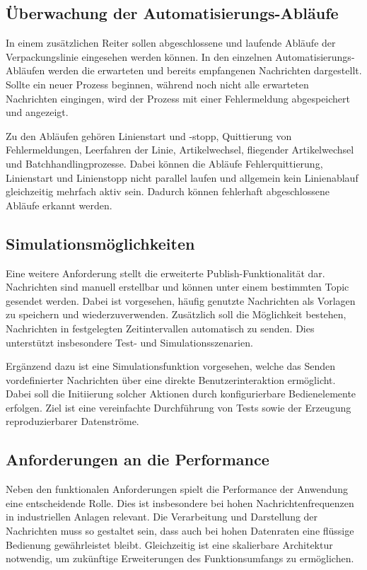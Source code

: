 \subsection{Überwachung der Automatisierungs-Abläufe}
In einem zusätzlichen Reiter sollen abgeschlossene und laufende Abläufe der Verpackungslinie eingesehen werden können. In den einzelnen Automatisierungs-Abläufen werden die erwarteten und bereits empfangenen Nachrichten dargestellt. Sollte ein neuer Prozess beginnen, während noch nicht alle erwarteten Nachrichten eingingen, wird der Prozess mit einer Fehlermeldung abgespeichert und angezeigt.

Zu den Abläufen gehören Linienstart und -stopp, Quittierung von Fehlermeldungen, Leerfahren der Linie, Artikelwechsel,  fliegender Artikelwechsel und Batchhandlingprozesse. Dabei können die Abläufe Fehlerquittierung, Linienstart und Linienstopp nicht parallel  laufen und allgemein kein Linienablauf gleichzeitig mehrfach aktiv sein. Dadurch können fehlerhaft abgeschlossene Abläufe erkannt werden.

\subsection{Simulationsmöglichkeiten}
Eine weitere Anforderung stellt die erweiterte Publish-Funktionalität dar. 
Nachrichten sind manuell erstellbar und können unter einem bestimmten Topic 
gesendet werden. Dabei ist vorgesehen, häufig genutzte Nachrichten 
als Vorlagen zu speichern und wiederzuverwenden. Zusätzlich soll die 
Möglichkeit bestehen, Nachrichten in festgelegten Zeitintervallen automatisch 
zu senden. Dies unterstützt insbesondere Test- und Simulationsszenarien.

Ergänzend dazu ist eine Simulationsfunktion vorgesehen, welche das Senden 
vordefinierter Nachrichten über eine direkte Benutzerinteraktion ermöglicht. 
Dabei soll die Initiierung solcher Aktionen durch konfigurierbare Bedienelemente erfolgen. Ziel ist eine vereinfachte Durchführung von Tests sowie der 
Erzeugung reproduzierbarer Datenströme.

\subsection{Anforderungen an die Performance}
Neben den funktionalen Anforderungen spielt die Performance der Anwendung eine 
entscheidende Rolle. Dies ist insbesondere bei hohen Nachrichtenfrequenzen in industriellen Anlagen relevant. Die Verarbeitung und Darstellung der Nachrichten muss so 
gestaltet sein, dass auch bei hohen Datenraten eine flüssige Bedienung 
gewährleistet bleibt. Gleichzeitig ist eine skalierbare Architektur notwendig, 
um zukünftige Erweiterungen des Funktionsumfangs zu ermöglichen.

